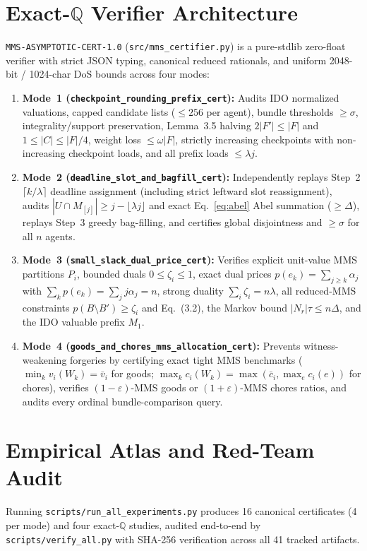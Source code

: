 \documentclass[11pt,twocolumn]{article}
\newcommand{\QQ}{\mathbb{Q}}
\begin{document}
\section{Exact-\texorpdfstring{$\QQ$}{Q} Verifier Architecture}\label{sec:certifier}
\texttt{MMS-ASYMPTOTIC-CERT-1.0} (\texttt{src/mms\_certifier.py}) is a pure-stdlib zero-float verifier with strict JSON typing, canonical reduced rationals, and uniform 2048-bit / 1024-char DoS bounds across four modes:
\begin{enumerate}[leftmargin=*,nosep]
  \item \textbf{Mode~1 (\texttt{checkpoint\_rounding\_\allowbreak prefix\_cert}):} Audits IDO normalized valuations, capped candidate lists ($\le 256$ per agent), bundle thresholds $\ge \sigma$, integrality/support preservation, Lemma~3.5 halving $2|F'| \le |F|$ and $1 \le |C| \le |F|/4$, weight loss $\le \omega |F|$, strictly increasing checkpoints with non-increasing checkpoint loads, and all prefix loads $\le \lambda j$.
  \item \textbf{Mode~2 (\texttt{deadline\_slot\_and\_\allowbreak bagfill\_cert}):} Independently replays Step~2 $\lceil k/\lambda\rceil$ deadline assignment (including strict leftward slot reassignment), audits $|U \cap M_{[j]}| \ge j - \lfloor\lambda j\rfloor$ and exact Eq.~\eqref{eq:abel} Abel summation ($\ge \Delta$), replays Step~3 greedy bag-filling, and certifies global disjointness and $\ge \sigma$ for all $n$ agents.
  \item \textbf{Mode~3 (\texttt{small\_slack\_dual\_\allowbreak price\_cert}):} Verifies explicit unit-value MMS partitions $P_i$, bounded duals $0 \le \zeta_i \le 1$, exact dual prices $p(e_k) = \sum_{j\ge k}\alpha_j$ with $\sum_k p(e_k) = \sum_j j\alpha_j = n$, strong duality $\sum_i \zeta_i = n\lambda$, all reduced-MMS constraints $p(B\setminus B') \ge \zeta_i$ and Eq.~(3.2), the Markov bound $|N_r|\tau \le n\Delta$, and the IDO valuable prefix $M_1$.
  \item \textbf{Mode~4 (\texttt{goods\_and\_chores\_mms\_\allowbreak allocation\_cert}):} Prevents witness-weakening forgeries by certifying exact tight MMS benchmarks ($\min_k v_i(W_k) = \bar{v}_i$ for goods; $\max_k c_i(W_k) = \max(\bar{c}_i, \max_e c_i(e))$ for chores), verifies $(1-\varepsilon)$-MMS goods or $(1+\varepsilon)$-MMS chores ratios, and audits every ordinal bundle-comparison query.
\end{enumerate}

\section{Empirical Atlas and Red-Team Audit}\label{sec:results}
Running \texttt{scripts/run\_all\_experiments.py} produces 16 canonical certificates (4 per mode) and four exact-$\QQ$ studies, audited end-to-end by \texttt{scripts/verify\_all.py} with SHA-256 verification across all 41 tracked artifacts.
\end{document}
